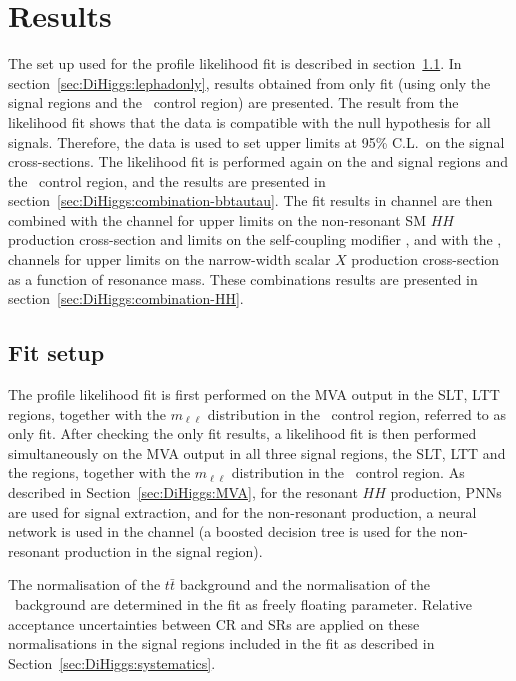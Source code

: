 \section{Results}
\label{sec:DiHiggs:results}

The set up used for the profile likelihood fit is described in section~\ref{sec:DiHiggs:analysis}.
In section~\ref{sec:DiHiggs:lephadonly}, results obtained from 
\lephad only fit (using only the \lephad signal regions and the \ZHF\ control region)
are presented.
The result from the likelihood fit shows that the data is compatible with
the null hypothesis for all signals. Therefore, the data is used to set
upper limits at 95\% C.L.\ on the signal cross-sections. 
The likelihood fit is performed again on the \lephad and 
\hadhad signal regions and the \ZHF\ control region,
and the results are presented in
section~\ref{sec:DiHiggs:combination-bbtautau}.
The fit results in \bbtt channel are then combined with the \bbyy channel
for upper limits on the non-resonant SM $HH$ production cross-section and 
limits on the self-coupling modifier \kl,
and with the \bbyy, \bbbb channels for upper limits
on the narrow-width scalar $X$ production cross-section as a function of resonance mass.
These combinations results are presented in section~\ref{sec:DiHiggs:combination-HH}.

\subsection{Fit setup}
\label{sec:DiHiggs:analysis}

The profile likelihood fit is first performed on the MVA output in the \lephad SLT, LTT regions, 
together with the $m_{\ell\ell}$ distribution in the 
\ZHF\ control region, referred to as \lephad only fit. After checking the \lephad only fit results, 
a likelihood fit is then performed simultaneously on the MVA output in all three signal regions, the \lephad SLT, LTT
and the \hadhad regions, together with the $m_{\ell\ell}$ distribution in the \ZHF\ control region.
As described in Section~\ref{sec:DiHiggs:MVA}, for the resonant $HH$ production, PNNs are used for 
signal extraction, and for the non-resonant production, a neural network is used in the \lephad channel 
(a boosted decision tree is used for the non-resonant production in the \hadhad signal region).  

The normalisation of the $t\bar{t}$ background and the normalisation of the \ZHF\ background 
are determined in the fit as freely floating parameter.  
Relative acceptance uncertainties between CR and SRs are applied on 
these normalisations in the signal regions included in the fit as described in Section~\ref{sec:DiHiggs:systematics}.

